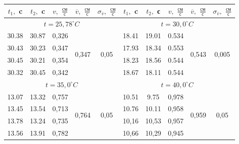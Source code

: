 \documentclass[a4paper, 12pt]{article}%
\begin{document}
\begin{table}[h]
\centering
\begin{tabular}{|c|c|c|c|c||c|c|c|c|c|}
\hline
$t_{1},$ c     & $t_{2},$ c   & $v,$ $\frac{\text{см}}{\text{с}}$   &$ \overline{v},$ $\frac{\text{см}}{\text{с}}$                & $\sigma_{\overline{v}}, $ $\frac{\text{см}}{\text{с}}$                &   $t_{1},$ c   & $t_{2},$ с    & $v,$ $\frac{\text{см}}{\text{с}}$    &$ \overline{v},$  $\frac{\text{см}}{\text{с}}$               & $\sigma_{\overline{v}}, $  $\frac{\text{см}}{\text{с}}$       \\ \hline
\multicolumn{5}{|c|}{ $t = 25,78^\circ C$}                                              & \multicolumn{5}{c|}{$t = 30,0^\circ C$}                                             \\ \hline
30.38 & 30.87 & 0,326 & \multirow{4}{*}{0,347} & \multirow{4}{*}{0,05} & 18.41 & 19.01 & 0.534 & \multirow{4}{*}{0,543} & \multirow{4}{*}{0,005} \\ \cline{1-3} \cline{6-8}
30.43 & 30.23 & 0,347 &                       &                       & 17.93 & 18.34 & 0.553 &                       &                       \\ \cline{1-3} \cline{6-8}
30.45 & 30.21 & 0,354 &                       &                       & 18.23 & 18.56 & 0.544 &                       &                       \\ \cline{1-3} \cline{6-8}
30.32 & 30.45 & 0,342 &                       &                       & 18.67 & 18.11 & 0.544 &                       &                       \\ \hline
\multicolumn{5}{|c|}{$t = 35,0^\circ C $}                                            & \multicolumn{5}{c|}{$t = 40,0^\circ C $}                                             \\ \hline
13.07 & 13.32 & 0,757 & \multirow{4}{*}{0,764} & \multirow{4}{*}{0,05} & 10.51 & 9.75 & 0,978 & \multirow{4}{*}{0,959} & \multirow{4}{*}{0,05} \\ \cline{1-3} \cline{6-8}
13.45 & 13.54 & 0,713 &                       &                       & 10.76 & 10.11 & 0,958 &                       &                       \\ \cline{1-3} \cline{6-8}
13.78 & 13.24 & 0,735 &                       &                       & 10,16 & 10,53 & 0,957 &                       &                       \\ \cline{1-3} \cline{6-8}
13.56 & 13.91 & 0,782 &                       &                       & 10,66 & 10,29 & 0,945 &                       &                       \\ \hline

\end{tabular}
\end{table}
\end{document}
